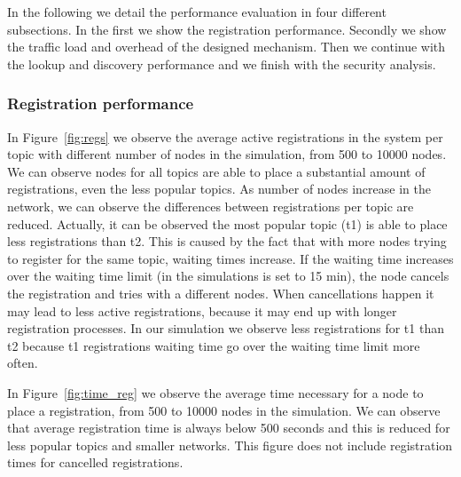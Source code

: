 In the following we detail the performance evaluation in four different subsections.  In the first we show the registration performance.  Secondly we show the traffic load and overhead of the designed mechanism.  Then we continue with the lookup and discovery performance and we finish with the security analysis.

\subsubsection{Registration  performance}

In Figure~\ref{fig:regs} we observe the average active registrations in the system per topic with different number of nodes in the simulation,  from 500 to 10000 nodes. 
We can observe nodes for all topics are able to place a substantial amount of registrations, even the less popular topics. 
As number of nodes increase in the network, we can observe the differences between registrations per topic are reduced. 
Actually, it can be observed the most popular topic (t1) is able to place less registrations than t2. 
This is caused by the fact that with more nodes trying to register for the same topic,  waiting times increase.
If the waiting time increases over the waiting time limit (in the simulations is set to 15 min),  the node cancels the registration and tries with a different nodes.
When cancellations happen it may lead to less active registrations, because it may end up with longer registration processes.
In our simulation we observe less registrations for t1 than t2  because t1 registrations waiting time go over the waiting time limit more often.

In Figure~\ref{fig:time_reg} we observe the average time necessary for a node to place a registration,  from 500 to 10000 nodes in the simulation.
We can observe that average registration time is always below 500 seconds and this is reduced for less popular topics and smaller networks. 
This figure does not include registration times for cancelled registrations.

